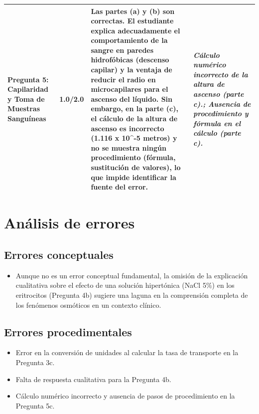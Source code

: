 \documentclass[11pt,a4paper]{article}
\begin{document}
\begin{longtable}{>{\bfseries}p{2.8cm} p{1.6cm} p{7.0cm} p{2.8cm}}
    \midrule
    \textbf{Pregunta 5: Capilaridad y Toma de Muestras Sanguíneas} & 1.0/2.0 & Las partes (a) y (b) son correctas. El estudiante explica adecuadamente el comportamiento de la sangre en paredes hidrofóbicas (descenso capilar) y la ventaja de reducir el radio en microcapilares para el ascenso del líquido. Sin embargo, en la parte (c), el cálculo de la altura de ascenso es incorrecto (1.116 x 10\textasciicircum{}-5 metros) y no se muestra ningún procedimiento (fórmula, sustitución de valores), lo que impide identificar la fuente del error. & \textit{Cálculo numérico incorrecto de la altura de ascenso (parte c).; Ausencia de procedimiento y fórmula en el cálculo (parte c).} \\
    \midrule
\end{longtable}

\section*{Análisis de errores}

\subsection*{Errores conceptuales}
\begin{itemize}[leftmargin=1.5em, itemsep=2pt]
  \item Aunque no es un error conceptual fundamental, la omisión de la explicación cualitativa sobre el efecto de una solución hipertónica (NaCl 5\%) en los eritrocitos (Pregunta 4b) sugiere una laguna en la comprensión completa de los fenómenos osmóticos en un contexto clínico.
\end{itemize}

\subsection*{Errores procedimentales}
\begin{itemize}[leftmargin=1.5em, itemsep=2pt]
  \item Error en la conversión de unidades al calcular la tasa de transporte en la Pregunta 3c.
  \item Falta de respuesta cualitativa para la Pregunta 4b.
  \item Cálculo numérico incorrecto y ausencia de pasos de procedimiento en la Pregunta 5c.
\end{itemize}
\end{document}
